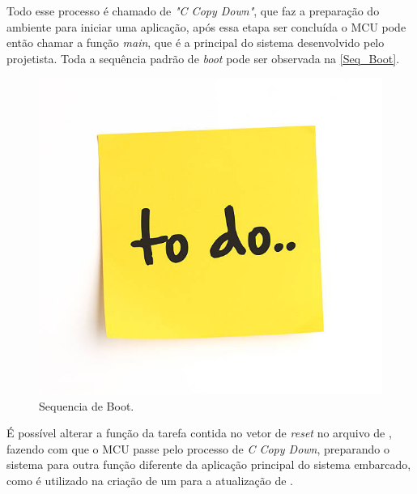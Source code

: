 Todo esse processo é chamado de \textit{"C Copy Down"}, que faz a preparação do ambiente para iniciar uma aplicação, após essa etapa ser concluída o MCU pode então chamar a função \textit{main}, que é a \firmware principal do sistema desenvolvido pelo projetista. Toda a sequência padrão de \textit{boot} pode ser observada na \autoref{Seq_Boot}.

\begin{figure}[H]
    \scriptsize
     \centering
     \includegraphics[scale=1]{dados/figuras/ToDo.jpg}
     \caption{Sequencia de Boot.}
     \label{Seq_Boot}
\end{figure}

É possível alterar a função da tarefa contida no vetor de \textit{reset} no arquivo de \linker, fazendo com que o MCU passe pelo processo de \textit{C Copy Down}, preparando o sistema para outra função diferente da aplicação principal do sistema embarcado, como é utilizado na criação de um \bootloader para a atualização de \firmware.













